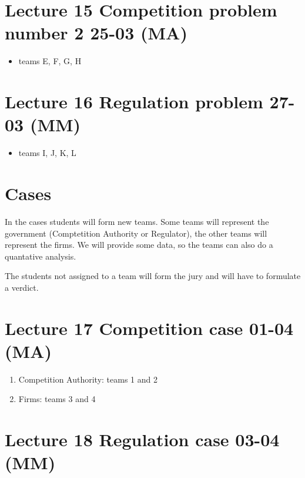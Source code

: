 \documentclass[]{book}
\providecommand{\tightlist}{%
  \setlength{\itemsep}{0pt}\setlength{\parskip}{0pt}}
\begin{document}
\section{Lecture 15 Competition problem number 2 25-03
(MA)}\label{lecture-15-competition-problem-number-2-25-03-ma}

\begin{itemize}
\tightlist
\item
  teams E, F, G, H
\end{itemize}

\section{Lecture 16 Regulation problem 27-03
(MM)}\label{lecture-16-regulation-problem-27-03-mm}

\begin{itemize}
\tightlist
\item
  teams I, J, K, L
\end{itemize}

\section{Cases}\label{cases}

In the cases students will form new teams. Some teams will represent the
government (Comptetition Authority or Regulator), the other teams will
represent the firms. We will provide some data, so the teams can also do
a quantative analysis.

The students not assigned to a team will form the jury and will have to
formulate a verdict.

\section{Lecture 17 Competition case 01-04
(MA)}\label{lecture-17-competition-case-01-04-ma}

\begin{enumerate}
\def\labelenumi{\alph{enumi}.}
\tightlist
\item
  Competition Authority: teams 1 and 2
\item
  Firms: teams 3 and 4
\end{enumerate}

\section{Lecture 18 Regulation case 03-04
(MM)}\label{lecture-18-regulation-case-03-04-mm}
\end{document}

